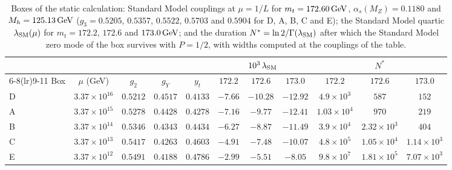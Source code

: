 \begin{table}[t]
\centering
\caption{Boxes of the static calculation: Standard Model couplings at $\mu=1/L$ for $m_t=172.60\,\mathrm{GeV}$, $\alpha_s(M_Z)=0.1180$ and $M_h=125.13\,\mathrm{GeV}$ ($g_3=0.5205$, $0.5357$, $0.5522$, $0.5703$ and $0.5904$ for D, A, B, C and E); the Standard Model quartic $\lambda_{\rm SM}(\mu)$ for $m_t=172.2$, $172.6$ and $173.0\,\mathrm{GeV}$; and the duration $N^*=\ln2/\Gamma(\lambda_{\rm SM})$ after which the Standard Model zero mode of the box survives with $P=1/2$, with widths computed at the couplings of the table.} %
\label{tab:v11-boxes}
\small
\setlength{\tabcolsep}{3.5pt}
\begin{tabular}{lcccccccccc}
\toprule
 & & & & & \multicolumn{3}{c}{$10^3\,\lambda_{\rm SM}$} & \multicolumn{3}{c}{$N^*$} \\
\cmidrule(lr){6-8}\cmidrule(lr){9-11}
Box & $\mu$ (GeV) & $g_2$ & $g_Y$ & $y_t$ & $172.2$ & $172.6$ & $173.0$ & $172.2$ & $172.6$ & $173.0$ \\
\midrule
D & $3.37\times10^{16}$ & $0.5212$ & $0.4517$ & $0.4133$ & $-7.66$ & $-10.28$ & $-12.92$ & $4.9\times10^3$ & $587$ & $152$ \\ %
A & $3.37\times10^{15}$ & $0.5278$ & $0.4428$ & $0.4278$ & $-7.16$ & $-9.77$ & $-12.41$ & $1.03\times10^4$ & $970$ & $219$ \\ %
B & $3.37\times10^{14}$ & $0.5346$ & $0.4343$ & $0.4434$ & $-6.27$ & $-8.87$ & $-11.49$ & $3.9\times10^4$ & $2.32\times10^3$ & $404$ \\ %
C & $3.37\times10^{13}$ & $0.5417$ & $0.4263$ & $0.4603$ & $-4.91$ & $-7.48$ & $-10.07$ & $4.8\times10^5$ & $1.05\times10^4$ & $1.14\times10^3$ \\ %
E & $3.37\times10^{12}$ & $0.5491$ & $0.4188$ & $0.4786$ & $-2.99$ & $-5.51$ & $-8.05$ & $9.8\times10^7$ & $1.81\times10^5$ & $7.07\times10^3$ \\ %
\bottomrule
\end{tabular}
\end{table}

